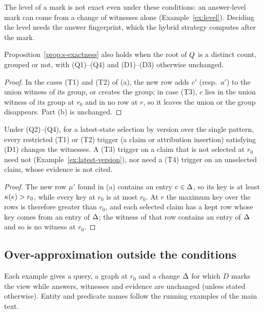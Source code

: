 \noindent The level of a mark is not exact even under these conditions: an answer-level mark
can come from a change of witnesses alone (Example~\ref{ex:level}). Deciding the level needs the
answer fingerprint, which the hybrid strategy computes after the mark.

\begin{remark}\label{rem:count}
Proposition~\ref{prop:s-exactness} also holds when the root of $Q$ is a distinct count, grouped
or not, with (Q1)--(Q4) and (D1)--(D3) otherwise unchanged.
\end{remark}
\begin{proof}
In the cases (T1) and (T2) of (a), the new row adds $c'$ (resp.\ $a'$) to the union witness of its
group, or creates the group; in case (T3), $c$ lies in the union witness of its group at $r_0$ and
in no row at $r$, so it leaves the union or the group disappears. Part (b) is unchanged.
\end{proof}

\begin{remark}\label{rem:latest}
Under (Q2)--(Q4), for a latest-state selection by version over the single pattern, every
restricted (T1) or (T2) trigger (a claim or attribution insertion) satisfying (D1) changes the
witnesses. A (T3) trigger on a claim that is not selected at $r_0$ need not
(Example~\ref{ex:latest-version}), nor need a (T4) trigger on an unselected claim, whose evidence
is not cited.
\end{remark}
\begin{proof}
The new row $\mu'$ found in (a) contains an entry $e\in\Delta$, so its key is at least
$\kappa(e)>r_0$, while every key at $r_0$ is at most $r_0$. At $r$ the maximum key over the rows is
therefore greater than $r_0$, and each selected claim has a kept row whose key comes from an entry
of $\Delta$; the witness of that row contains an entry of $\Delta$ and so is no witness at $r_0$.
\end{proof}

\subsection{Over-approximation outside the conditions}

Each example gives a query, a graph at $r_0$ and a change $\Delta$ for which $D$ marks the view
while answers, witnesses and evidence are unchanged (unless stated otherwise). Entity and predicate
names follow the running examples of the main text.

